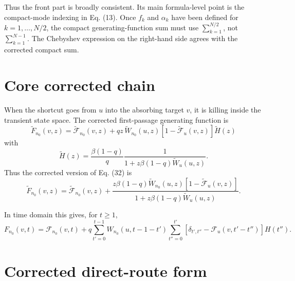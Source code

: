 \documentclass[11pt]{article}
\newcommand{\wt}{\widetilde}
\newcommand{\Fcal}{\mathcal{F}}
\begin{document}
Thus the front part is broadly consistent.  Its main formula-level point is the
compact-mode indexing in Eq. (13).  Once \(f_k\) and \(\alpha_k\) have been
defined for \(k=1,\ldots,N/2\), the compact generating-function sum must use
\(\sum_{k=1}^{N/2}\), not \(\sum_{k=1}^{N-1}\).  The Chebyshev expression on
the right-hand side agrees with the corrected compact sum.

\section*{Core corrected chain}

When the shortcut goes from \(u\) into the absorbing target \(v\), it is killing
inside the transient state space.  The corrected first-passage generating
function is
\begin{equation}
\boxed{
\wt F_{n_0}(v,z)=
\wt{\Fcal}_{n_0}(v,z)
+qz\,\wt W_{n_0}(u,z)
\left[1-\wt{\Fcal}_{u}(v,z)\right]\wt H(z)}
\label{eq:correct-F-H}
\end{equation}
with
\begin{equation}
\boxed{
  \wt H(z)=
  \frac{\beta(1-q)}{q}
  \frac{1}{1+z\beta(1-q)\wt W_u(u,z)}.}
\label{eq:correct-H}
\end{equation}
Thus the corrected version of Eq. (32) is
\begin{equation}
\boxed{
\wt F_{n_0}(v,z)=
\wt{\Fcal}_{n_0}(v,z)+
\frac{z\beta(1-q)\wt W_{n_0}(u,z)
\left[1-\wt{\Fcal}_{u}(v,z)\right]}
{1+z\beta(1-q)\wt W_u(u,z)}.}
\label{eq:correct-eq32}
\end{equation}

In time domain this gives, for \(t\geq 1\),
\begin{equation}
\boxed{
F_{n_0}(v,t)=\Fcal_{n_0}(v,t)
+q\sum_{t'=0}^{t-1}W_{n_0}(u,t-1-t')
\sum_{t''=0}^{t'}
\left[\delta_{t',t''}-\Fcal_u(v,t'-t'')\right]
H(t'').}
\label{eq:correct-eq40}
\end{equation}

\section*{Corrected direct-route form}
\end{document}
